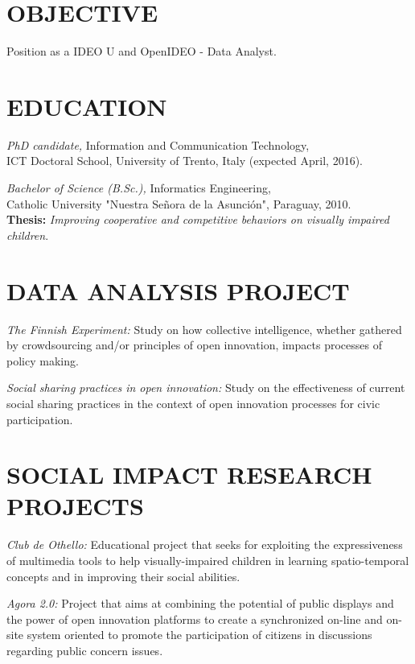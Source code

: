 \documentclass[line,margin]{res}
\begin{document}

\address{Via delle Cave 13, Trento, Italy}
\address{jorgesaldivar@gmail.com}

\begin{resume}
 
\section{OBJECTIVE} Position as a IDEO U and OpenIDEO - Data Analyst. 
 
\section{EDUCATION} 
	{\sl PhD candidate,} Information and Communication Technology,\\ 
ICT Doctoral School, University of Trento, Italy (expected April, 2016).
                
	{\sl Bachelor of Science (B.Sc.),} Informatics Engineering,\\ 
    Catholic University "Nuestra Se\~nora de la Asunci\'on", Paraguay, 2010.\\
    {\bf Thesis:} \emph{Improving cooperative and competitive behaviors on visually impaired children}.
 
\section{DATA ANALYSIS PROJECT}
	{\sl The Finnish Experiment:} Study on how collective intelligence, whether gathered by crowdsourcing and/or principles of open innovation, impacts processes of policy making.
	
	{\sl Social sharing practices in open innovation:} Study on the effectiveness of current social sharing practices in the context of open innovation processes for civic participation.
	
 
\section{SOCIAL IMPACT RESEARCH PROJECTS}
	{\sl Club de Othello:} Educational project that seeks for exploiting the expressiveness of multimedia tools to help visually-impaired children in learning spatio-temporal concepts and in improving their social abilities.
	
	{\sl Agora 2.0:} Project that aims at combining the potential of public displays and the power of open innovation platforms to create a synchronized on-line and on-site system oriented to promote the participation of citizens in discussions regarding public concern issues.
	

\end{resume}
\end{document}
